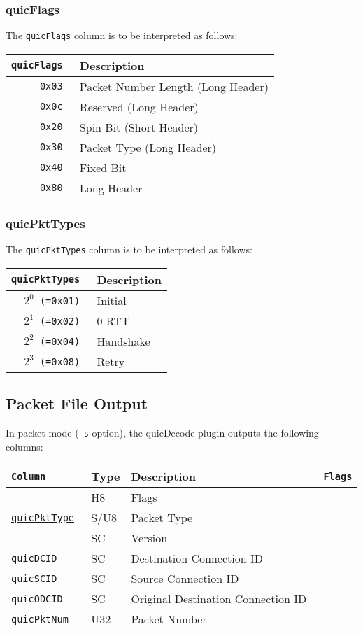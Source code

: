 \documentclass[documentation]{subfiles}
\begin{document}
\subsubsection{quicFlags}\label{quicFlags}
The {\tt quicFlags} column is to be interpreted as follows:
\begin{longtable}{>{\tt}rl}
    \toprule
    {\bf quicFlags} & {\bf Description}\\
    \midrule\endhead%
    0x03 & Packet Number Length (Long Header)\\
    0x0c & Reserved (Long Header)\\
    0x20 & Spin Bit (Short Header)\\
    0x30 & Packet Type (Long Header)\\
    0x40 & Fixed Bit\\
    0x80 & Long Header\\
    \bottomrule
\end{longtable}

\subsubsection{quicPktTypes}\label{quicPktTypes}
The {\tt quicPktTypes} column is to be interpreted as follows:
\begin{longtable}{>{\tt}rl}
    \toprule
    {\bf quicPktTypes} & {\bf Description}\\
    \midrule\endhead%
    $2^{0}$ (=0x01) & Initial\\
    $2^{1}$ (=0x02) & 0-RTT\\
    $2^{2}$ (=0x04) & Handshake\\
    $2^{3}$ (=0x08) & Retry\\
    \bottomrule
\end{longtable}

\subsection{Packet File Output}
In packet mode ({\tt --s} option), the quicDecode plugin outputs the following columns:
\begin{longtable}{>{\tt}lll>{\tt\small}l}
    \toprule
    {\bf Column} & {\bf Type} & {\bf Description} & {\bf Flags}\\
    \midrule\endhead%
    \nameref{quicFlags}                  & H8   & Flags                              & \\
    \hyperref[quicPktTypes]{quicPktType} & S/U8 & Packet Type                        & \\
    \nameref{quicVersion}                & SC   & Version                            & \\
    quicDCID                             & SC   & Destination Connection ID          & \\
    quicSCID                             & SC   & Source Connection ID               & \\
    quicODCID                            & SC   & Original Destination Connection ID & \\
    quicPktNum                           & U32  & Packet Number                      & \\
    \bottomrule
\end{longtable}
\end{document}
